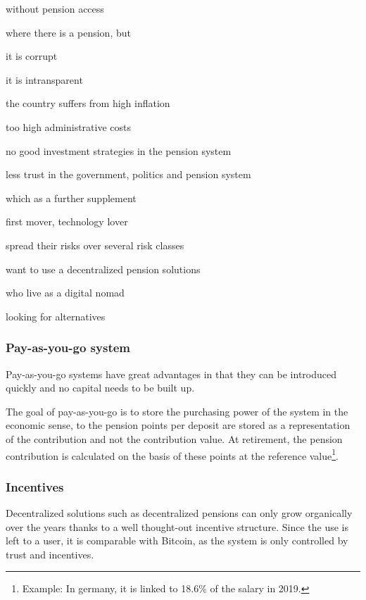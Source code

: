 \begin{compactitem}
\item without pension access
\item where there is a pension, but
 \begin{compactitem}
 \item it is corrupt
 \item it is intransparent
 \item the country suffers from high inflation
 \item too high administrative costs
 \item no good investment strategies in the pension system
 \item less trust in the government, politics and pension system
 \end{compactitem}
\item which as a further supplement 
 \begin{compactitem}
 \item first mover, technology lover
 \item spread their risks over several risk classes
 \item want to use a decentralized pension solutions
 \item who live as a digital nomad
 \item looking for alternatives
 \end{compactitem}
\end{compactitem}

\subsubsection{Pay-as-you-go system}


Pay-as-you-go systems have great advantages in that they can be introduced quickly and no capital needs to be built up.

The goal of pay-as-you-go is to store the purchasing power of the system in the economic sense, to the pension points per deposit are stored as a representation of the contribution and not the contribution value.
At retirement, the pension contribution is calculated on the basis of these points at the reference value\footnote{Example: In germany, it is linked to 18.6\% of the salary in 2019.}.


\subsubsection{Incentives}
Decentralized solutions such as decentralized pensions can only grow organically over the years thanks to a well thought-out incentive structure. Since the use is left to a user, it is comparable with Bitcoin\cite{nakamoto2012bitcoin}, as the system is only controlled by trust and incentives.

